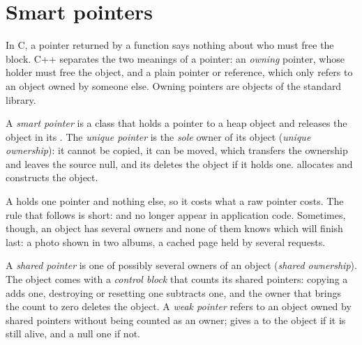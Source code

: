 \section{Smart pointers}\label{sec:b2:cpp-copy-move:smart}

In C, a pointer returned by a function says nothing about who must free the block. C++ separates the two meanings
of a pointer: an \emph{owning} pointer, whose holder must free the object, and a plain pointer or reference, which
only refers to an object owned by someone else. Owning pointers are objects of the standard library.

\begin{definition}\label{def:b2:cpp-copy-move:unique-ptr}
A \emph{smart pointer} is a class that holds a pointer to a heap object and releases the object
in its . The \emph{unique pointer}  is the \emph{sole}
owner of its object (\emph{unique ownership}): it cannot be copied, it can be moved, which
transfers the ownership and leaves the source null, and its  deletes the object if it holds one.
 allocates and constructs the object.
\end{definition}

\label{lst:b2:cpp-copy-move:unique}

\label{out:b2:cpp-copy-move:unique}

A  holds one pointer and nothing else, so it costs what a raw pointer costs. The rule that
follows is short:  and  no longer appear in application code. Sometimes, though, an object
has several owners and none of them knows which will finish last: a photo shown in two albums, a cached page held
by several requests.

\begin{definition}\label{def:b2:cpp-copy-move:shared-ptr}
A \emph{shared pointer}  is one of possibly several owners of an
object (\emph{shared ownership}). The object comes with a \emph{control block} that counts its
shared pointers: copying a  adds one, destroying or resetting one subtracts one, and the owner that
brings the count to zero deletes the object. A \emph{weak pointer} 
refers to an object owned by shared pointers without being counted as an owner;  gives a
 to the object if it is still alive, and a null one if not.
\end{definition}

